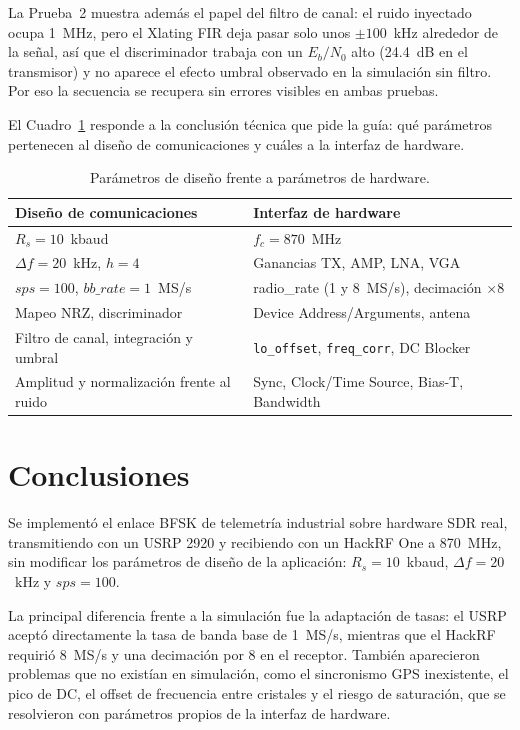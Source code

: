 \documentclass[conference]{IEEEtran}
\begin{document}
La Prueba~2 muestra además el papel del filtro de canal: el ruido inyectado ocupa 1~MHz, pero el Xlating FIR deja pasar solo unos $\pm 100$~kHz alrededor de la señal, así que el discriminador trabaja con un $E_b/N_0$ alto (24.4~dB en el transmisor) y no aparece el efecto umbral observado en la simulación sin filtro. Por eso la secuencia se recupera sin errores visibles en ambas pruebas.

El Cuadro~\ref{tab:sep} responde a la conclusión técnica que pide la guía: qué parámetros pertenecen al diseño de comunicaciones y cuáles a la interfaz de hardware.

\begin{table}[!t]
\centering
\caption{Parámetros de diseño frente a parámetros de hardware.}
\label{tab:sep}
\begin{tabular}{>{\raggedright}p{3.6cm}p{3.9cm}}
\toprule
Diseño de comunicaciones & Interfaz de hardware \\
\midrule
$R_s = 10$~kbaud & $f_c = 870$~MHz \\
$\Delta f = 20$~kHz, $h = 4$ & Ganancias TX, AMP, LNA, VGA \\
$sps = 100$, $bb\_rate = 1$~MS/s & radio\_rate (1 y 8~MS/s), decimación $\times 8$ \\
Mapeo NRZ, discriminador & Device Address/Arguments, antena \\
Filtro de canal, integración y umbral & \texttt{lo\_offset}, \texttt{freq\_corr}, DC Blocker \\
Amplitud y normalización frente al ruido & Sync, Clock/Time Source, Bias-T, Bandwidth \\
\bottomrule
\end{tabular}
\end{table}

\section{Conclusiones}

Se implementó el enlace BFSK de telemetría industrial sobre hardware SDR real, transmitiendo con un USRP 2920 y recibiendo con un HackRF One a 870~MHz, sin modificar los parámetros de diseño de la aplicación: $R_s = 10$~kbaud, $\Delta f = 20$~kHz y $sps = 100$.

La principal diferencia frente a la simulación fue la adaptación de tasas: el USRP aceptó directamente la tasa de banda base de 1~MS/s, mientras que el HackRF requirió 8~MS/s y una decimación por 8 en el receptor. También aparecieron problemas que no existían en simulación, como el sincronismo GPS inexistente, el pico de DC, el offset de frecuencia entre cristales y el riesgo de saturación, que se resolvieron con parámetros propios de la interfaz de hardware.
\end{document}
